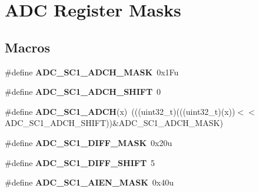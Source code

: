 \hypertarget{group__ADC__Register__Masks}{}\section{A\+DC Register Masks}
\label{group__ADC__Register__Masks}
\subsection*{Macros}
\begin{DoxyCompactItemize}
\item 
\#define {\bfseries A\+D\+C\+\_\+\+S\+C1\+\_\+\+A\+D\+C\+H\+\_\+\+M\+A\+SK}~0x1\+Fu\hypertarget{group__ADC__Register__Masks_ga7450ced3c2b2df20023c2152f1470640}{}\label{group__ADC__Register__Masks_ga7450ced3c2b2df20023c2152f1470640}

\item 
\#define {\bfseries A\+D\+C\+\_\+\+S\+C1\+\_\+\+A\+D\+C\+H\+\_\+\+S\+H\+I\+FT}~0\hypertarget{group__ADC__Register__Masks_gab2ba46d5132224f2920c1881e2c1b6fe}{}\label{group__ADC__Register__Masks_gab2ba46d5132224f2920c1881e2c1b6fe}

\item 
\#define {\bfseries A\+D\+C\+\_\+\+S\+C1\+\_\+\+A\+D\+CH}(x)~(((uint32\+\_\+t)(((uint32\+\_\+t)(x))$<$$<$A\+D\+C\+\_\+\+S\+C1\+\_\+\+A\+D\+C\+H\+\_\+\+S\+H\+I\+FT))\&A\+D\+C\+\_\+\+S\+C1\+\_\+\+A\+D\+C\+H\+\_\+\+M\+A\+SK)\hypertarget{group__ADC__Register__Masks_gab2ec3f01d5b560d3f839439b038f3981}{}\label{group__ADC__Register__Masks_gab2ec3f01d5b560d3f839439b038f3981}

\item 
\#define {\bfseries A\+D\+C\+\_\+\+S\+C1\+\_\+\+D\+I\+F\+F\+\_\+\+M\+A\+SK}~0x20u\hypertarget{group__ADC__Register__Masks_gadc514fb491cf08eb3fb0f27298388645}{}\label{group__ADC__Register__Masks_gadc514fb491cf08eb3fb0f27298388645}

\item 
\#define {\bfseries A\+D\+C\+\_\+\+S\+C1\+\_\+\+D\+I\+F\+F\+\_\+\+S\+H\+I\+FT}~5\hypertarget{group__ADC__Register__Masks_ga1385c936a9440856068dcb917ed9c658}{}\label{group__ADC__Register__Masks_ga1385c936a9440856068dcb917ed9c658}

\item 
\#define {\bfseries A\+D\+C\+\_\+\+S\+C1\+\_\+\+A\+I\+E\+N\+\_\+\+M\+A\+SK}~0x40u\hypertarget{group__ADC__Register__Masks_gaa698d898e077003de10a42184de8f124}{}\label{group__ADC__Register__Masks_gaa698d898e077003de10a42184de8f124}


\end{DoxyCompactItemize}
